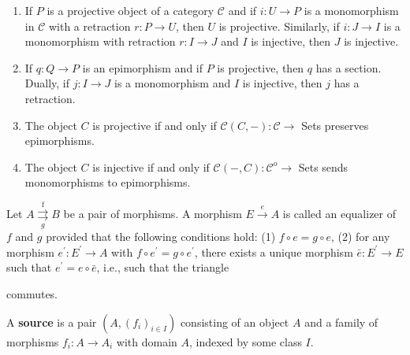 \begin{prop}
\begin{enumerate}
    \item If $P$ is a projective object of a category $\mathcal{C}$ and if $i: U \rightarrow P$ is a monomorphism in $\mathcal{C}$ with a retraction $r: P \rightarrow U$, then $U$ is projective. Similarly, if $i: J \rightarrow I$ is a monomorphism with retraction $r: I \rightarrow J$ and $I$ is injective, then $J$ is injective.    
    \item If $q: Q \rightarrow P$ is an epimorphism and if $P$ is projective, then $q$ has a section. Dually, if $j: I \rightarrow J$ is a monomorphism and $I$ is injective, then $j$ has a retraction.
    \item The object $C$ is projective if and only if $\mathcal{C}(C,-): \mathcal{C} \rightarrow$ Sets preserves epimorphisms. 
    \item The object $C$ is injective if and only if $\mathcal{C}(-, C): \mathcal{C}^o \rightarrow$ Sets sends monomorphisms to epimorphisms.
\end{enumerate}
\end{prop}




Let $A \stackrel{\text { f }}{\underset{g}{\rightrightarrows}} B$ be a pair of morphisms. A morphism $E \xrightarrow{e} A$ is called an equalizer of $f$ and $g$ provided that the following conditions hold:
(1) $f \circ e=g \circ e$,
(2) for any morphism $e^{\prime}: E^{\prime} \rightarrow A$ with $f \circ e^{\prime}=g \circ e^{\prime}$, there exists a unique morphism $\bar{e}: E^{\prime} \rightarrow E$ such that $e^{\prime}=e \circ \bar{e}$, i.e., such that the triangle
 commutes.
    

A \textbf{source} is a pair $\left(A,\left(f_i\right)_{i \in I}\right)$ consisting of an object $A$ and a family of morphisms $f_i: A \rightarrow A_i$ with domain $A$, indexed by some class $I$. 


